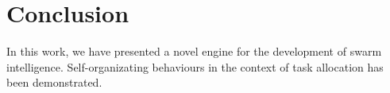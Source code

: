 \section{Conclusion} \label{section:conclusion}

In this work, we have presented a novel engine for the development of swarm intelligence.
Self-organizating behaviours in the context of task allocation has been demonstrated.

\textcolor{purple}{
    \blindtext
    \blindtext
}